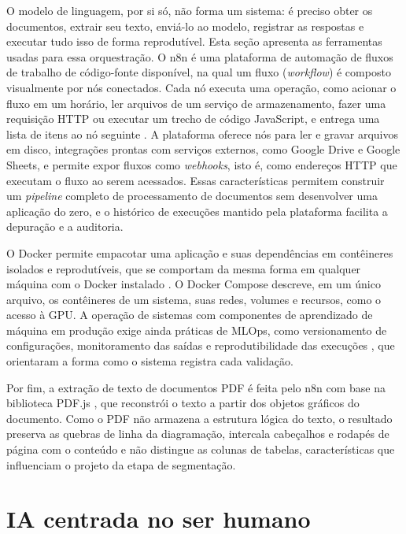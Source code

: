 O modelo de linguagem, por si só, não forma um sistema: é preciso obter os documentos, extrair seu texto, enviá-lo ao modelo, registrar as respostas e executar tudo isso de forma reprodutível. Esta seção apresenta as ferramentas usadas para essa orquestração. O n8n é uma plataforma de automação de fluxos de trabalho de código-fonte disponível, na qual um fluxo (\textit{workflow}) é composto visualmente por nós conectados. Cada nó executa uma operação, como acionar o fluxo em um horário, ler arquivos de um serviço de armazenamento, fazer uma requisição HTTP ou executar um trecho de código JavaScript, e entrega uma lista de itens ao nó seguinte \cite{n8nDocs}. A plataforma oferece nós para ler e gravar arquivos em disco, integrações prontas com serviços externos, como Google Drive e Google Sheets, e permite expor fluxos como \textit{webhooks}, isto é, como endereços HTTP que executam o fluxo ao serem acessados. Essas características permitem construir um \textit{pipeline} completo de processamento de documentos sem desenvolver uma aplicação do zero, e o histórico de execuções mantido pela plataforma facilita a depuração e a auditoria.

O Docker permite empacotar uma aplicação e suas dependências em contêineres isolados e reprodutíveis, que se comportam da mesma forma em qualquer máquina com o Docker instalado \cite{Merkel2014}. O Docker Compose descreve, em um único arquivo, os contêineres de um sistema, suas redes, volumes e recursos, como o acesso à GPU. A operação de sistemas com componentes de aprendizado de máquina em produção exige ainda práticas de MLOps, como versionamento de configurações, monitoramento das saídas e reprodutibilidade das execuções \cite{Kreuzberger2023}, que orientaram a forma como o sistema registra cada validação.

Por fim, a extração de texto de documentos PDF é feita pelo n8n com base na biblioteca PDF.js \cite{PDFjs}, que reconstrói o texto a partir dos objetos gráficos do documento. Como o PDF não armazena a estrutura lógica do texto, o resultado preserva as quebras de linha da diagramação, intercala cabeçalhos e rodapés de página com o conteúdo e não distingue as colunas de tabelas, características que influenciam o projeto da etapa de segmentação.

\section{IA centrada no ser humano}
\label{sec:humano}

